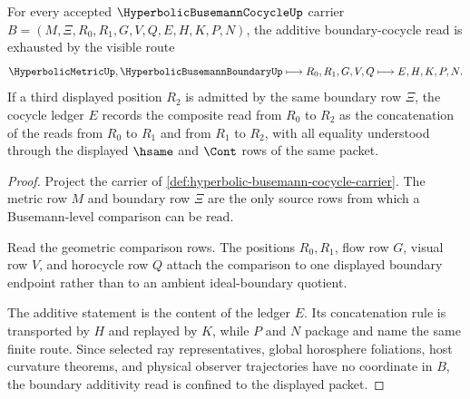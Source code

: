 \begin{theorem}
\label{thm:hyperbolic-busemann-cocycle-boundary-additivity}
For every accepted $\HyperbolicBusemannCocycleUp$ carrier $B=(M,\Xi,R_0,R_1,G,V,Q,E,H,K,P,N)$, the additive boundary-cocycle read is exhausted by the visible route
$$
\HyperbolicMetricUp,\HyperbolicBusemannBoundaryUp
\longmapsto
R_0,R_1,G,V,Q
\longmapsto
E,H,K,P,N .
$$
If a third displayed position $R_2$ is admitted by the same boundary row $\Xi$, the cocycle ledger $E$ records the composite read from $R_0$ to $R_2$ as the concatenation of the reads from $R_0$ to $R_1$ and from $R_1$ to $R_2$, with all equality understood through the displayed $\hsame$ and $\Cont$ rows of the same packet.
\end{theorem}
\begin{proof}
Project the carrier of \autoref{def:hyperbolic-busemann-cocycle-carrier}. The metric row $M$ and boundary row $\Xi$ are the only source rows from which a Busemann-level comparison can be read.

Read the geometric comparison rows. The positions $R_0,R_1$, flow row $G$, visual row $V$, and horocycle row $Q$ attach the comparison to one displayed boundary endpoint rather than to an ambient ideal-boundary quotient.

The additive statement is the content of the ledger $E$. Its concatenation rule is transported by $H$ and replayed by $K$, while $P$ and $N$ package and name the same finite route. Since selected ray representatives, global horosphere foliations, host curvature theorems, and physical observer trajectories have no coordinate in $B$, the boundary additivity read is confined to the displayed packet.
\end{proof}

\begin{closurestatus}{\HyperbolicBusemannCocycleUp}
  \theoryclosure{\seedClosure}
  \formalstatus{\unformalizedV}
\end{closurestatus}
